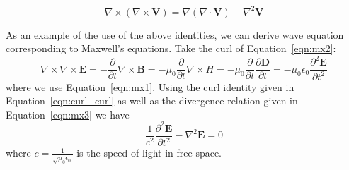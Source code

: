 \documentclass{article}[12pt]
\theoremstyle{plain}
\begin{document}
\begin{equation}
\nabla \times ( \nabla \times \mathbf{V} ) = \nabla(\nabla \cdot \mathbf{V}) - 
\nabla^2\mathbf{V} \label{eqn:curl_curl}
\end{equation}

As an example of the use of the above identities, we can derive wave equation
corresponding to Maxwell's
equations. Take the curl of Equation~\ref{eqn:mx2}:
\begin{equation}
\nabla \times \nabla \times \mathbf{E} = - \frac{\partial}{\partial t} \nabla \times \mathbf{B}
= -\mu_0 \frac{\partial}{\partial t} \nabla \times H
= -\mu_0 \frac{\partial}{\partial t} \frac{\partial \mathbf{D}}{\partial t}
= -\mu_0 \epsilon_0 \frac{\partial^2 \mathbf{E}}{\partial t^2} \label{eqn:wave}
\end{equation}
where we use Equation~\ref{eqn:mx1}.
 Using the curl identity given in
Equation~\ref{eqn:curl_curl} as well as the divergence relation given in Equation~\ref{eqn:mx3}
we have
\begin{equation}
\frac{1}{c^2} \frac{\partial^2 \mathbf{E}}{\partial t^2} - \nabla^2\mathbf{E} = 0
\end{equation}
where $c=\frac{1}{\sqrt{\mu_0\epsilon_0}}$ is the speed of light in free space.
\end{document}
